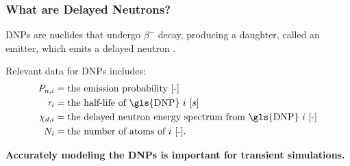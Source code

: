 \begin{frame}
  \frametitle{What are Delayed Neutrons?}
        \Glspl{DNP} are nuclides that undergo $\beta^-$ decay, producing a daughter, called an emitter, which emits a delayed neutron \cite{bank2000jef}.

        \begin{block}{Relevant data for \glspl{DNP} includes:}
            \[
            \begin{aligned}
                P_{n, i} &= \text{the emission probability [-]} \\
                \tau_i &= \text{the half-life of \gls{DNP} $i$ [$s$]} \\
                \chi_{d, i} &= \text{the delayed neutron energy spectrum from \gls{DNP} $i$ [-]} \\
                N_i &= \text{the number of atoms of $i$ [-]}.
            \end{aligned}
            \]
        \end{block}

        \textbf{Accurately modeling the \glspl{DNP} is important for transient simulations.}
\end{frame}